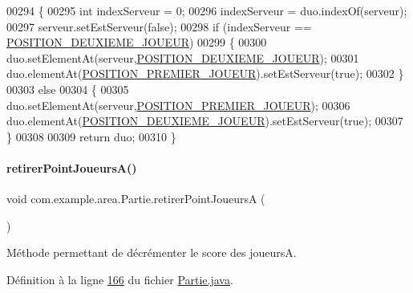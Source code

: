 \begin{DoxyCode}
00294     \{
00295         \textcolor{keywordtype}{int} indexServeur = 0;
00296         indexServeur = duo.indexOf(serveur);
00297         serveur.setEstServeur(\textcolor{keyword}{false});
00298         \textcolor{keywordflow}{if} (indexServeur == \hyperlink{classcom_1_1example_1_1area_1_1_partie_a6b5837dffa2af6a8da369f69916498f4}{POSITION\_DEUXIEME\_JOUEUR})
00299         \{
00300             duo.setElementAt(serveur,\hyperlink{classcom_1_1example_1_1area_1_1_partie_a6b5837dffa2af6a8da369f69916498f4}{POSITION\_DEUXIEME\_JOUEUR});
00301             duo.elementAt(\hyperlink{classcom_1_1example_1_1area_1_1_partie_a2f977d38424ff199a053d9e3cd4eb8c6}{POSITION\_PREMIER\_JOUEUR}).setEstServeur(\textcolor{keyword}{true});
00302         \}
00303         \textcolor{keywordflow}{else}
00304         \{
00305             duo.setElementAt(serveur,\hyperlink{classcom_1_1example_1_1area_1_1_partie_a2f977d38424ff199a053d9e3cd4eb8c6}{POSITION\_PREMIER\_JOUEUR});
00306             duo.elementAt(\hyperlink{classcom_1_1example_1_1area_1_1_partie_a6b5837dffa2af6a8da369f69916498f4}{POSITION\_DEUXIEME\_JOUEUR}).setEstServeur(\textcolor{keyword}{true});
00307         \}
00308 
00309         \textcolor{keywordflow}{return} duo;
00310     \}
\end{DoxyCode}
\mbox{\label{classcom_1_1example_1_1area_1_1_partie_a2847b07aff035a02c130f6219efc5312}} 
\paragraph{\texorpdfstring{retirer\+Point\+Joueurs\+A()}{retirerPointJoueursA()}}
{\footnotesize\ttfamily void com.\+example.\+area.\+Partie.\+retirer\+Point\+JoueursA (\begin{DoxyParamCaption}{ }\end{DoxyParamCaption})}



Méthode permettant de décrémenter le score des joueursA. 



Définition à la ligne \hyperlink{_partie_8java_source_l00166}{166} du fichier \hyperlink{_partie_8java_source}{Partie.\+java}.



